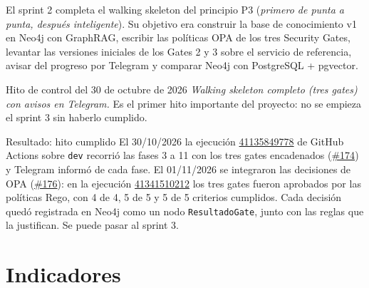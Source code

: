\documentclass[11pt,a4paper]{report}
\newcommand{\pr}[1]{\href{https://github.com/PracticasESPE/Framework_Desarrollo_Seguro/pull/#1}{\##1}}
\newcommand{\run}[1]{\href{https://github.com/PracticasESPE/Framework_Desarrollo_Seguro/actions/runs/#1}{#1}}
\begin{document}
El sprint 2 completa el walking skeleton del principio P3 (\emph{primero de punta a punta,
después inteligente}). Su objetivo era construir la base de conocimiento v1 en Neo4j con
GraphRAG, escribir las políticas OPA de los tres Security Gates, levantar las versiones iniciales
de los Gates 2 y 3 sobre el servicio de referencia, avisar del progreso por Telegram y comparar
Neo4j con PostgreSQL + pgvector.

\begin{cajaazul}{Hito de control del 30 de octubre de 2026}
\emph{Walking skeleton completo (tres gates) con avisos en Telegram.} Es el primer hito
importante del proyecto: no se empieza el sprint 3 sin haberlo cumplido.
\end{cajaazul}

\begin{cajaverde}{Resultado: hito cumplido}
El 30/10/2026 la ejecución \run{41135849778} de GitHub Actions sobre \texttt{dev} recorrió las
fases 3 a 11 con los tres gates encadenados (\pr{174}) y Telegram informó de cada fase. El
01/11/2026 se integraron las decisiones de OPA (\pr{176}): en la ejecución \run{41341510212} los
tres gates fueron aprobados por las políticas Rego, con 4 de 4, 5 de 5 y 5 de 5 criterios
cumplidos. Cada decisión quedó registrada en Neo4j como un nodo \texttt{ResultadoGate}, junto con
las reglas que la justifican. Se puede pasar al sprint 3.
\end{cajaverde}

\section{Indicadores}
\end{document}
